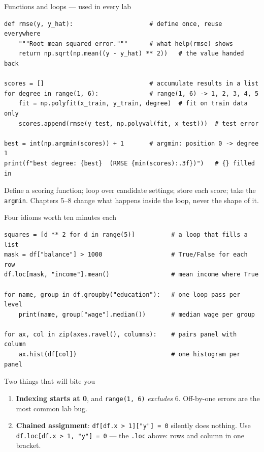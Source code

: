 \documentclass[aspectratio=169,11pt]{beamer}
\begin{document}
\begin{frame}[fragile]{Functions and loops --- used in every lab}
\begin{lstlisting}
def rmse(y, y_hat):                     # define once, reuse everywhere
    """Root mean squared error."""      # what help(rmse) shows
    return np.sqrt(np.mean((y - y_hat) ** 2))   # the value handed back

scores = []                             # accumulate results in a list
for degree in range(1, 6):              # range(1, 6) -> 1, 2, 3, 4, 5
    fit = np.polyfit(x_train, y_train, degree)  # fit on train data only
    scores.append(rmse(y_test, np.polyval(fit, x_test)))  # test error

best = int(np.argmin(scores)) + 1       # argmin: position 0 -> degree 1
print(f"best degree: {best}  (RMSE {min(scores):.3f})")   # {} filled in
\end{lstlisting}
  \begin{takeaway}
    Define a scoring function; loop over candidate settings; store each score;
    take the \texttt{argmin}. Chapters 5--8 change what happens inside the
    loop, never the shape of it.
  \end{takeaway}
\end{frame}

\begin{frame}[fragile]{Four idioms worth ten minutes each}
\begin{lstlisting}
squares = [d ** 2 for d in range(5)]          # a loop that fills a list
mask = df["balance"] > 1000                   # True/False for each row
df.loc[mask, "income"].mean()                 # mean income where True

for name, group in df.groupby("education"):   # one loop pass per level
    print(name, group["wage"].median())       # median wage per group

for ax, col in zip(axes.ravel(), columns):    # pairs panel with column
    ax.hist(df[col])                          # one histogram per panel
\end{lstlisting}
  \begin{alertblock}{Two things that will bite you}
    \begin{enumerate}
      \item \textbf{Indexing starts at 0}, and \texttt{range(1, 6)} \emph{excludes}
            6. Off-by-one errors are the most common lab bug.
      \item \textbf{Chained assignment}: \texttt{df[df.x > 1]["y"] = 0} silently
            does nothing. Use \mbox{\texttt{df.loc[df.x > 1, "y"] = 0}} ---
            the \texttt{.loc} above: rows and column in one bracket.
    \end{enumerate}
  \end{alertblock}
\end{frame}
\end{document}
